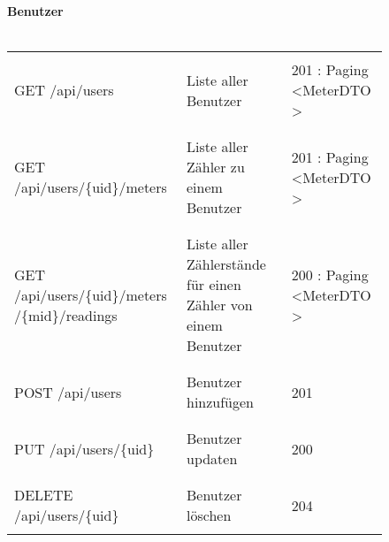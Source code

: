 \begin{figure}[H]
	\textbf{Benutzer}\\ \\
	\begin{tabularx}{\textwidth}{X | X | X}
	\hline \\
	GET /api/users & Liste aller Benutzer & 201 : Paging \textless MeterDTO \textgreater\\ \\ \hline
	\\ GET /api/users/\{uid\}/meters & Liste aller Zähler zu einem Benutzer & 201 : Paging \textless MeterDTO \textgreater  \\ \\ \hline
	\\ GET /api/users/\{uid\}/meters /\{mid\}/readings & Liste aller Zählerstände für einen Zähler von einem Benutzer &  200 : Paging \textless MeterDTO \textgreater \\ \\ \hline
	\\ POST /api/users & Benutzer hinzufügen &201 \\ \\ \hline
	\\ PUT /api/users/\{uid\} & Benutzer updaten & 200\\ \\ \hline
	\\ DELETE /api/users/\{uid\} & Benutzer löschen & 204\\ \\ \hline
	\end{tabularx}
\end{figure}
